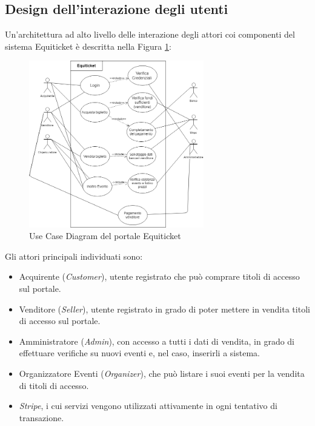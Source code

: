 \subsection{Design dell'interazione degli utenti}
Un'architettura ad alto livello delle interazione degli attori coi componenti del sistema Equiticket è descritta nella Figura \ref{usecase}:
\begin{figure}[htbp]
	\centering
	\includegraphics[width=0.68\textwidth]{chapter4/immagini/usecase}
	\caption{Use Case Diagram del portale Equiticket}
	\label{usecase}
\end{figure}
Gli attori principali individuati sono: 
\begin{itemize}
\item Acquirente (\textit{Customer}), utente registrato che può comprare titoli di accesso sul portale.
\item Venditore (\textit{Seller}), utente registrato in grado di poter mettere in vendita titoli di accesso sul portale.
\item Amministratore (\textit{Admin}), con accesso a tutti i dati di vendita, in grado di effettuare verifiche su nuovi eventi e, nel caso, inserirli a sistema.  
\item Organizzatore Eventi (\textit{Organizer}), che può listare i suoi eventi per la vendita di titoli di accesso.
\item \textit{Stripe}, i cui servizi vengono utilizzati attivamente in ogni tentativo di transazione. 
\end{itemize}
